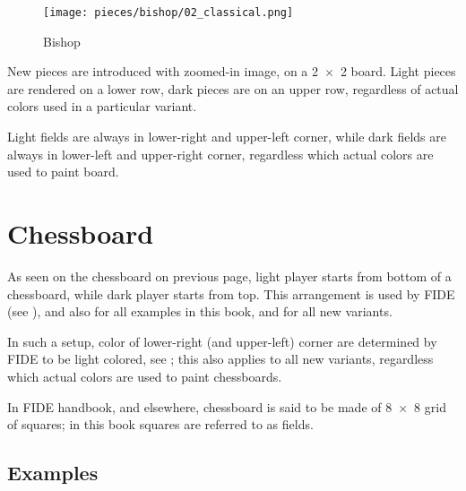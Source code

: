 \noindent
\begin{wrapfigure}[12]{l}{0.4\textwidth}
\centering
\texttt{[image: pieces/bishop/02\_classical.png]}
\caption{Bishop}
\label{fig:bishop/02_classical}
\end{wrapfigure}
New pieces are introduced with zoomed-in image, on a \mbox{2 $\times$ 2} board.
Light pieces are rendered on a lower row, dark pieces are on an upper row,
regardless of actual colors used in a particular variant. %

Light fields are always in lower-right and upper-left corner, while dark fields
are always in lower-left and upper-right corner, regardless which actual colors
are used to paint board.


\section*{Chessboard}
\label{sec:Classical Chess/Chessboard}

As seen on the chessboard on previous page, light player starts from bottom of
a chessboard, while dark player starts from top. This arrangement is used by FIDE
(see ), and also for all examples in this book, and for all new
variants.

In such a setup, color of lower-right (and upper-left) corner are determined by
FIDE to be light colored, see ; this also applies to all new
variants, regardless which actual colors are used to paint chessboards.

In FIDE handbook, and elsewhere, chessboard is said to be made of \mbox{8 $\times$ 8}
grid of squares; in this book squares are referred to as fields.

\clearpage %

\subsection*{Examples}
\label{sec:Classical Chess/Chessboard/Examples}


